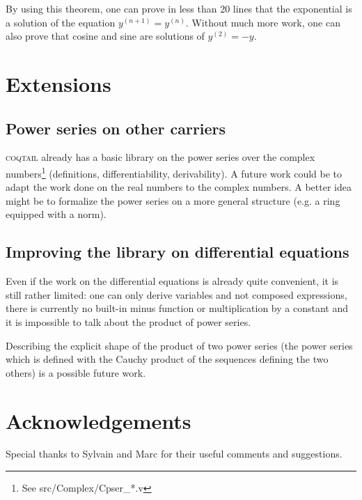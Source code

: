 \documentclass[submission,copyright]{eptcs}
\newcommand{\coqtail}{\textsc{coqtail}}
\begin{document}
By using this theorem, one can prove in less than 20 lines that the
exponential is a solution of the equation $y^{(n+1)} = y^{(n)}$. Without
much more work, one can also prove that cosine and sine are solutions
of $y^{(2)} = - y$.

\section{Extensions}

\subsection{Power series on other carriers}

\coqtail{} already has a basic library on the power series over the complex
numbers\footnote{See src/Complex/Cpser\_*.v} (definitions, differentiability,
derivability). A future work could be to adapt the work done on the real
numbers to the complex numbers. A better idea might be to formalize the
power series on a more general structure (e.g. a ring equipped with a norm).

\subsection{Improving the library on differential equations}

Even if the work on the differential equations is already quite
convenient, it is still rather limited: one can only derive variables
and not composed expressions, there is currently no built-in minus
function or multiplication by a constant and it is impossible to talk
about the product of power series.

Describing the explicit shape of the product of two power series (the
power series which is defined with the Cauchy product of the sequences
defining the two others) is a possible future work.

\nocite{*}



\section{Acknowledgements}

Special thanks to Sylvain and Marc for their useful comments and
suggestions.
\end{document}

